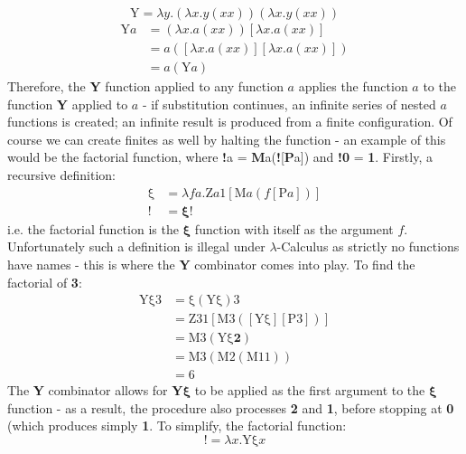 \documentclass[Master.tex]{subfiles}
\begin{document}
\begin{equation*}
\bm{\mathrm{Y}} = \lambda y.(\lambda x.y(xx))(\lambda x.y(xx))
\end{equation*}
\begin{equation*}
\begin{aligned}
\bm{\mathrm{Y}}a &= (\lambda x.a(xx))[\lambda x.a(xx)]\\
&= a([\lambda x.a(xx)][\lambda x.a(xx)])\\
&= a(\bm{\mathrm{Y}}a)
\end{aligned}
\end{equation*}
Therefore, the \textbf{Y} function applied to any function $a$ applies the function $a$ to the function \textbf{Y} applied to $a$ - if substitution continues, an infinite series of nested $a$ functions is created; an infinite result is produced from a finite configuration. Of course we can create finites as well by halting the function - an example of this would be the factorial function, where \textbf{!}a = \textbf{M}a(\textbf{!}[\textbf{P}a]) and \textbf{!0} = \textbf{1}. Firstly, a recursive definition:
\begin{equation*}
\begin{aligned}
\bm{\mathrm{\xi}} &= \lambda fa.\bm{\mathrm{Z}}a\bm{\mathrm{1}}[\bm{\mathrm{M}}a(f[\bm{\mathrm{P}}a])]\\
\bm{!} &= \bm{\xi}!
\end{aligned}
\end{equation*}
i.e. the factorial function is the $\bm{\xi}$ function with itself as the argument $f$. Unfortunately such a definition is illegal under $\lambda$-Calculus as strictly no functions have names - this is where the \textbf{Y} combinator comes into play. To find the factorial of \textbf{3}:
\begin{equation*}
\begin{aligned}
\bm{\mathrm{Y\xi 3}} &= \bm{\mathrm{\xi}}(\bm{\mathrm{Y\xi}})\bm{\mathrm{3}}\\
&= \bm{\mathrm{Z31}}[\bm{\mathrm{M3}}([\bm{\mathrm{Y\xi}}][\bm{\mathrm{P3}}])]\\
&= \bm{\mathrm{M3}}(\bm{\mathrm{Y\xi}}\bm{2})\\
&= \bm{\mathrm{M3}}(\bm{\mathrm{M2}}(\bm{\mathrm{M11}}))\\
&= \bm{\mathrm{6}}
\end{aligned}
\end{equation*}
The \textbf{Y} combinator allows for \textbf{Y}$\bm{\xi}$ to be applied as the first argument to the $\bm{\xi}$ function - as a result, the procedure also processes \textbf{2} and \textbf{1}, before stopping at \textbf{0} (which produces simply \textbf{1}. To simplify, the factorial function:
\begin{equation*}
\bm{!} = \lambda x.\bm{\mathrm{Y\xi}}x
\end{equation*}
\end{document}
